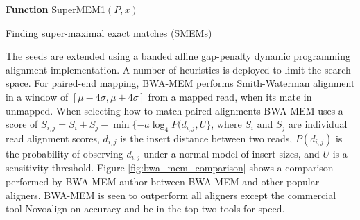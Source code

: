 \begin{algorithm2e}[h]
\DontPrintSemicolon
\footnotesize
{}
\BlankLine
\textbf{Function} {\sc SuperMEM1}$(P,x)$
\caption{Finding super-maximal exact matches (SMEMs)\autocite{li2012exploring}}
\label{alg:find_smems}
\end{algorithm2e}

The seeds are extended using a banded affine gap-penalty dynamic programming alignment implementation. A number of heuristics is deployed to limit the search space. For paired-end mapping, BWA-MEM performs Smith-Waterman alignment in a window of $[\mu - 4\sigma, \mu+4\sigma]$ from a mapped read, when its mate in unmapped. When selecting how to match paired alignments BWA-MEM uses a score of $S_{i,j}=S_i+S_j-\min{\{-a\log_4P(d_{i,j},U\}}$, where $S_i$ and $S_j$ are individual read alignment scores, $d_{i,j}$ is the insert distance between two reads, $P(d_{i,j})$ is the probability of observing $d_{i,j}$ under a normal model of insert sizes, and $U$ is a sensitivity threshold. Figure \ref{fig:bwa_mem_comparison} shows a comparison performed by BWA-MEM author between BWA-MEM and other popular aligners. BWA-MEM is seen to outperform all aligners except the commercial tool Novoalign on accuracy and be in the top two tools for speed.

